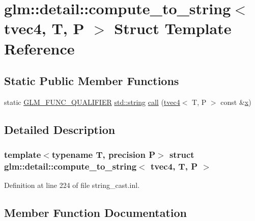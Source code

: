 \hypertarget{structglm_1_1detail_1_1compute__to__string_3_01tvec4_00_01_t_00_01_p_01_4}{}\section{glm\+::detail\+::compute\+\_\+to\+\_\+string$<$ tvec4, T, P $>$ Struct Template Reference}
\label{structglm_1_1detail_1_1compute__to__string_3_01tvec4_00_01_t_00_01_p_01_4}
\subsection*{Static Public Member Functions}
\begin{DoxyCompactItemize}
\item 
static \mbox{\hyperlink{setup_8hpp_a33fdea6f91c5f834105f7415e2a64407}{G\+L\+M\+\_\+\+F\+U\+N\+C\+\_\+\+Q\+U\+A\+L\+I\+F\+I\+ER}} \mbox{\hyperlink{glad_8h_ac83513893df92266f79a515488701770}{std\+::string}} \mbox{\hyperlink{structglm_1_1detail_1_1compute__to__string_3_01tvec4_00_01_t_00_01_p_01_4_aa91e3c2d9b945aaf2dd840690de03437}{call}} (\mbox{\hyperlink{structglm_1_1tvec4}{tvec4}}$<$ T, P $>$ const \&\mbox{\hyperlink{glad_8h_a92d0386e5c19fb81ea88c9f99644ab1d}{x}})
\end{DoxyCompactItemize}


\subsection{Detailed Description}
\subsubsection*{template$<$typename T, precision P$>$\newline
struct glm\+::detail\+::compute\+\_\+to\+\_\+string$<$ tvec4, T, P $>$}



Definition at line 224 of file string\+\_\+cast.\+inl.



\subsection{Member Function Documentation}
\mbox{\label{structglm_1_1detail_1_1compute__to__string_3_01tvec4_00_01_t_00_01_p_01_4_aa91e3c2d9b945aaf2dd840690de03437}} 
